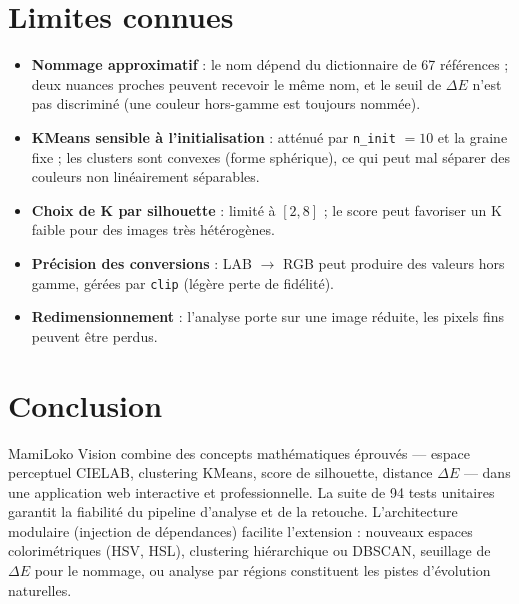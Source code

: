 \documentclass[11pt,a4paper]{article}
\begin{document}
\section{Limites connues}

\begin{itemize}
  \item \textbf{Nommage approximatif} : le nom dépend du dictionnaire de 67
        références ; deux nuances proches peuvent recevoir le même nom, et
        le seuil de $\Delta E$ n'est pas discriminé (une couleur
        hors-gamme est toujours nommée).
  \item \textbf{KMeans sensible à l'initialisation} : atténué par
        \texttt{n\_init} $= 10$ et la graine fixe ; les clusters sont
        convexes (forme sphérique), ce qui peut mal séparer des couleurs
        non linéairement séparables.
  \item \textbf{Choix de K par silhouette} : limité à $[2, 8]$ ; le score
        peut favoriser un K faible pour des images très hétérogènes.
  \item \textbf{Précision des conversions} : LAB $\rightarrow$ RGB peut
        produire des valeurs hors gamme, gérées par \texttt{clip}
        (légère perte de fidélité).
  \item \textbf{Redimensionnement} : l'analyse porte sur une image réduite,
        les pixels fins peuvent être perdus.
\end{itemize}

\section{Conclusion}

MamiLoko Vision combine des concepts mathématiques éprouvés --- espace
perceptuel CIELAB, clustering KMeans, score de silhouette, distance
$\Delta E$ --- dans une application web interactive et professionnelle.
La suite de 94 tests unitaires garantit la fiabilité du pipeline
d'analyse et de la retouche. L'architecture modulaire (injection de
dépendances) facilite l'extension : nouveaux espaces colorimétriques
(HSV, HSL), clustering hiérarchique ou DBSCAN, seuillage de $\Delta E$
pour le nommage, ou analyse par régions constituent les pistes
d'évolution naturelles.
\end{document}
